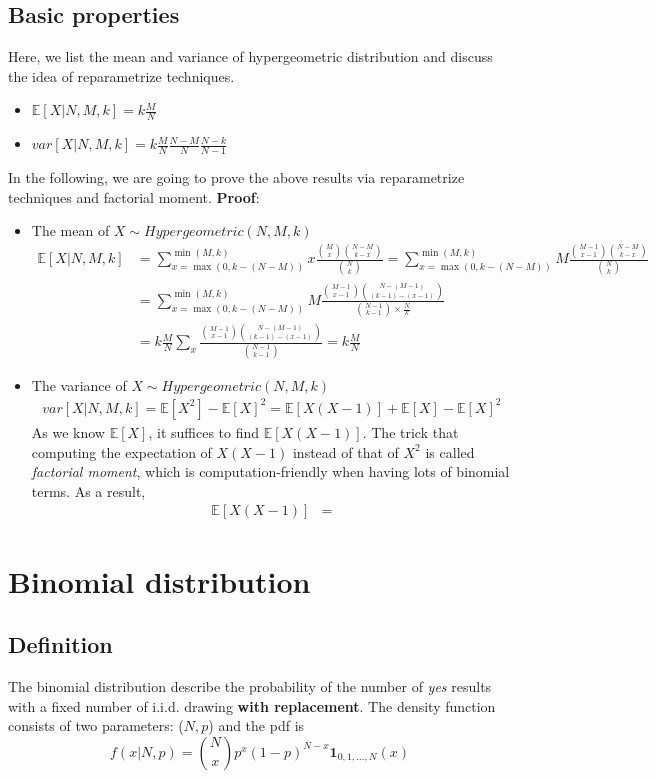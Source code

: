 \documentclass[../Distributions.tex]{subfiles}
\begin{document}
\subsection{Basic properties}
Here, we list the mean and variance of hypergeometric distribution and discuss the idea of reparametrize techniques.
\begin{itemize}
	\item $\mathbb{E}[X|N,M,k] = k\frac{M}{N}$
	\item $var[X|N,M,k]=k\frac{M}{N}\frac{N-M}{N}\frac{N-k}{N-1}$
\end{itemize}
In the following, we are going to prove the above results via reparametrize techniques and factorial moment.
{\bf Proof}:
\begin{itemize}
	\item The mean of $X\sim\textit{Hypergeometric}(N,M,k)$
	\begin{align*}
	\mathbb{E}[X|N,M,k] &= \sum_{x=\max(0,k-(N-M))}^{\min(M,k)} x \frac{{M\choose x}{N-M \choose k-x}}{{N\choose k}}= \sum_{x=\max(0,k-(N-M))}^{\min(M,k)} M \frac{{M-1\choose x-1}{N-M \choose k-x}}{{N\choose k}}\\
	&= \sum_{x=\max(0,k-(N-M))}^{\min(M,k)} M \frac{{M-1\choose x-1}{N-(M-1) \choose (k-1)-(x-1)}}{{N-1\choose k-1}\times\frac{N}{k}}\\
	&=k\frac{M}{N}\sum_{x}\frac{{M-1\choose x-1}{N-(M-1) \choose (k-1)-(x-1)}}{{N-1\choose k-1}}=k\frac{M}{N}
	\end{align*}
	\item The variance of $X\sim\textit{Hypergeometric}(N,M,k)$
	\begin{align*}
	var[X|N,M,k] = \mathbb{E}[X^2]-\mathbb{E}[X]^2 = \mathbb{E}[X(X-1)] + \mathbb{E}[X] - \mathbb{E}[X]^2
	\end{align*}
	As we know $\mathbb{E}[X]$, it suffices to find $\mathbb{E}[X(X-1)]$. The trick that computing the expectation of $X(X-1)$ instead of that of $X^2$ is called {\it factorial moment}, which is computation-friendly when having lots of binomial terms. As a result,
	\begin{align*}
	\mathbb{E}[X(X-1)] &= 
	\end{align*}
\end{itemize}

\section{Binomial distribution}
\subsection{Definition}
The binomial distribution describe the probability of the number of {\it yes} results with a fixed number of i.i.d. drawing {\bf with replacement}. The density function consists of two parameters: ($N,p$) and the pdf is
$$f(x|N,p) = {N\choose x}p^x(1-p)^{N-x}\mathbf{1}_{0,1,...,N}(x)$$
\end{document}
